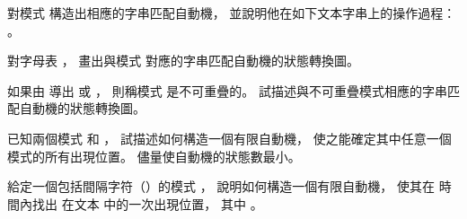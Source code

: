 \startsection[
  title={String matching with finite automata},
]

\startEXERCISE
對模式  構造出相應的字串匹配自動機，
並說明他在如下文本字串上的操作過程： 。
\stopEXERCISE

\startANSWER
{}
\stopANSWER

\startEXERCISE
對字母表 ，
畫出與模式  對應的字串匹配自動機的狀態轉換圖。
\stopEXERCISE

\startANSWER
{}
\stopANSWER

\startEXERCISE
如果由  導出  或 ，
則稱模式  是{\EMP 不可重疊的}。
試描述與不可重疊模式相應的字串匹配自動機的狀態轉換圖。
\stopEXERCISE

\startANSWER
{}
\stopANSWER

\startEXERCISE
已知兩個模式  和 ，
試描述如何構造一個有限自動機，
使之能確定其中任意一個模式的所有出現位置。
儘量使自動機的狀態數最小。
\stopEXERCISE

\startANSWER
{}
\stopANSWER

\startEXERCISE
給定一個包括間隔字符（）的模式 ，
說明如何構造一個有限自動機，
使其在  時間內找出  在文本  中的一次出現位置，
其中 。
\stopEXERCISE

\startANSWER
{}
\stopANSWER


\stopsection
